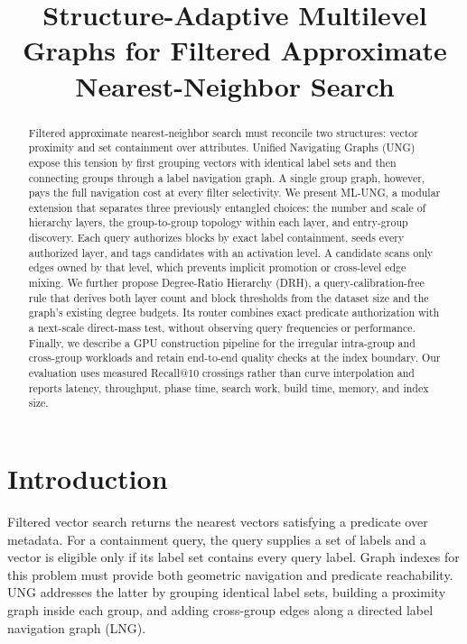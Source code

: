 \documentclass[sigconf,review,anonymous]{acmart}
\title{Structure-Adaptive Multilevel Graphs for Filtered Approximate Nearest-Neighbor Search}
\newcommand{\system}{\textsc{ML-UNG}}
\begin{document}
\begin{abstract}
Filtered approximate nearest-neighbor search must reconcile two structures:
vector proximity and set containment over attributes.  Unified Navigating
Graphs (UNG)~\cite{cai2024ung} expose this tension by first grouping vectors with identical label
sets and then connecting groups through a label navigation graph.  A single
group graph, however, pays the full navigation cost at every filter
selectivity.  We present \system, a modular extension that separates three
previously entangled choices: the number and scale of hierarchy layers, the
group-to-group topology within each layer, and entry-group discovery.  Each
query authorizes blocks by exact label containment, seeds every authorized
layer, and tags candidates with an activation level.  A candidate scans only
edges owned by that level, which prevents implicit promotion or cross-level
edge mixing.  We further propose Degree-Ratio Hierarchy (DRH), a
query-calibration-free rule that derives both layer count and block thresholds
from the dataset size and the graph's existing degree budgets.  Its router
combines exact predicate authorization with a next-scale direct-mass test,
without observing query frequencies or performance.  Finally, we
describe a GPU construction pipeline for the irregular intra-group and
cross-group workloads and retain end-to-end quality checks at the index
boundary.  Our evaluation uses measured Recall@10 crossings rather than curve
interpolation and reports latency, throughput, phase time, search work, build
time, memory, and index size.  \authoritativeAbstractResult
\end{abstract}

\maketitle

\section{Introduction}
Filtered vector search returns the nearest vectors satisfying a predicate over
metadata.  For a containment query, the query supplies a set of labels and a
vector is eligible only if its label set contains every query label.  Graph
indexes for this problem must provide both geometric navigation and predicate
reachability.  UNG addresses the latter by grouping identical label sets,
building a proximity graph inside each group, and adding cross-group edges
along a directed label navigation graph (LNG).
\end{document}
